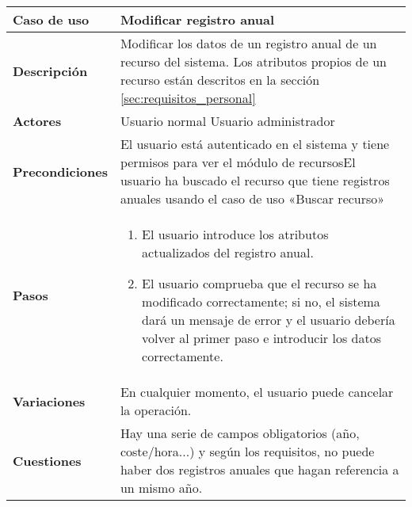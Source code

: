 \begin{tabular}{|p{1.25in}|p{3.65in}|}\hline
\textbf{Caso de uso} & \textbf{Modificar registro anual}\\\hline\hline
\textbf{Descripción} & Modificar los datos de un registro anual de un recurso
del sistema. Los atributos propios de un recurso están descritos en la sección
\ref{sec:requisitos_personal}\\\hline
\textbf{Actores} & Usuario normal \newline Usuario administrador\\\hline
\textbf{Precondiciones} & El usuario está autenticado en el sistema y
tiene permisos para ver el módulo de recursos\newline El usuario ha
buscado el recurso que tiene registros anuales usando el caso de uso «Buscar
recurso»\\\hline
\textbf{Pasos} & 
  \begin{enumerate}
   \item El usuario introduce los atributos actualizados del registro anual.
   \item El usuario comprueba que el recurso se ha modificado correctamente; si
no, el sistema dará un mensaje de error y el usuario debería volver al primer
paso e introducir los datos correctamente.
  \end{enumerate}
\\\hline
\textbf{Variaciones} & En cualquier momento, el usuario puede cancelar
la operación.\\\hline
\textbf{Cuestiones} & Hay una serie de campos obligatorios (año,
coste/hora...) y según los requisitos, no puede haber dos registros
anuales que hagan referencia a un mismo año.\\\hline
\end{tabular}

